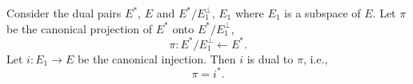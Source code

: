 Consider the dual pairs $E^*$, $E$ and $E^*/E_1^\perp$, $E_1$ where $E_1$ is a subspace of $E$. Let $\pi$ be the canonical projection of $E^*$ onto $E^*/E_1^\perp$,
$$\pi: E^*/E_1^\perp \leftarrow E^*.$$
Let $i: E_1 \rightarrow E$ be the canonical injection. Then $i$ is dual to $\pi$, i.e.,
$$\pi = i^*.$$
